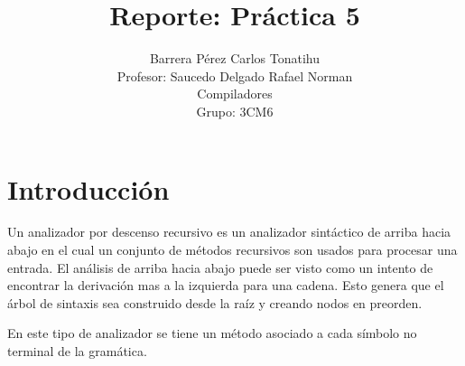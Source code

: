 \documentclass[12pt, titlepage]{article}
\title{Reporte: Práctica 5}
\author{Barrera Pérez Carlos Tonatihu \\ Profesor: Saucedo Delgado Rafael 
Norman 
\\ Compiladores \\ Grupo: 3CM6}
\begin{document}
\maketitle
\tableofcontents
\newpage
\section{Introducción}
Un analizador por descenso recursivo es un analizador sintáctico de arriba hacia abajo en el cual un conjunto de métodos recursivos son usados para procesar una entrada.
El análisis de arriba hacia abajo puede ser visto como un intento de encontrar la derivación mas a la izquierda para una cadena.
Esto genera que el árbol de sintaxis sea construido desde la raíz y creando nodos en preorden. \cite{compis}

En este tipo de analizador se tiene un método asociado a cada símbolo no 
terminal de la gramática.
\newpage
\end{document}
